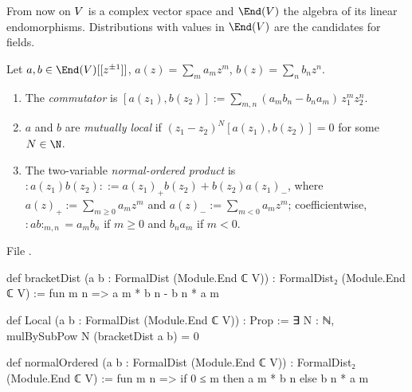 From now on $V$ is a complex vector space and $\End(\loneV)$ the algebra of its linear endomorphisms.
Distributions with values in $\End(\loneV)$ are the candidates for fields.

\begin{definition}\label{l01:def:bracket}
Let $a,b\in\End(\loneV)[[z^{\pm1}]]$, $a(z) = \sum_ma_mz^m$, $b(z) = \sum_nb_nz^n$.
\begin{enumerate}[label=(\roman*)]
\item The \emph{commutator} is $[a(z_1),b(z_2)] := \sum_{m,n}(a_mb_n-b_na_m)\,z_1^mz_2^n$.
\item $a$ and $b$ are \emph{mutually local} if $(z_1-z_2)^N[a(z_1),b(z_2)] = 0$ for some $N\in\N$.
\item The two-variable \emph{normal-ordered product} is
  ${:}a(z_1)b(z_2){:} := a(z_1)_+b(z_2)+b(z_2)a(z_1)_-$, where $a(z)_+ := \sum_{m\ge0}a_mz^m$ and
  $a(z)_- := \sum_{m<0}a_mz^m$; coefficientwise, ${:}ab{:}_{m,n} = a_mb_n$ if $m\ge0$ and $b_na_m$ if $m<0$.
\end{enumerate}
\end{definition}

\noindent File .
\begin{leancode}
def bracketDist (a b : FormalDist (Module.End ℂ V)) : FormalDist₂ (Module.End ℂ V) :=
  fun m n => a m * b n - b n * a m

def Local (a b : FormalDist (Module.End ℂ V)) : Prop :=
  ∃ N : ℕ, mulBySubPow N (bracketDist a b) = 0

def normalOrdered (a b : FormalDist (Module.End ℂ V)) : FormalDist₂ (Module.End ℂ V) :=
  fun m n => if 0 ≤ m then a m * b n else b n * a m
\end{leancode}

